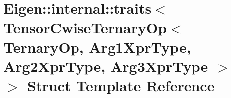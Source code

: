 \hypertarget{struct_eigen_1_1internal_1_1traits_3_01_tensor_cwise_ternary_op_3_01_ternary_op_00_01_arg1_xpr_tfaef9778449e83c93f69e5312efba568}{}\section{Eigen\+:\+:internal\+:\+:traits$<$ Tensor\+Cwise\+Ternary\+Op$<$ Ternary\+Op, Arg1\+Xpr\+Type, Arg2\+Xpr\+Type, Arg3\+Xpr\+Type $>$ $>$ Struct Template Reference}
\label{struct_eigen_1_1internal_1_1traits_3_01_tensor_cwise_ternary_op_3_01_ternary_op_00_01_arg1_xpr_tfaef9778449e83c93f69e5312efba568}
